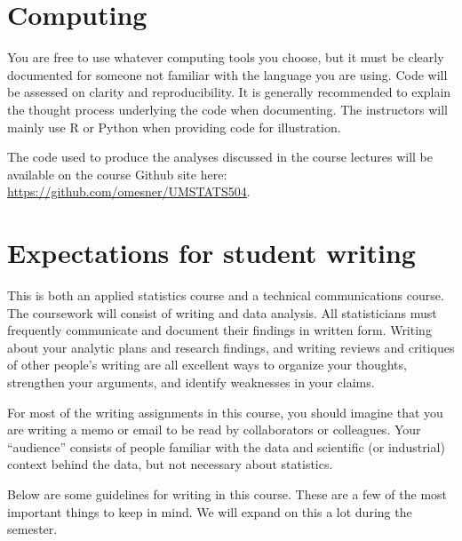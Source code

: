 \documentclass[11pt]{article}
\begin{document}
\section*{Computing}

You are free to use whatever computing tools you choose, but it must be clearly documented for someone not familiar with the language you are using.
Code will be assessed on clarity and reproducibility.
It is generally recommended to explain the thought process underlying the code when documenting.
The instructors will mainly use R or Python when providing code for illustration.

The code used to produce the analyses discussed in the course lectures will be available on the course Github site here: \url{https://github.com/omesner/UMSTATS504}.

\section*{Expectations for student writing}

This is both an applied statistics course and a technical communications course. The coursework will consist of writing and data analysis. All statisticians must frequently communicate and document their findings in written form. Writing about your analytic plans and research findings, and writing reviews and critiques of other people’s writing are all excellent ways to organize your thoughts, strengthen your arguments, and identify weaknesses in your claims.

For most of the writing assignments in this course, you should imagine that you are writing a memo or email to be read by collaborators or colleagues. Your “audience” consists of people familiar with the data and scientific (or industrial) context behind the data, but not necessary about statistics.

Below are some guidelines for writing in this course. These are a few of the most important things to keep in mind. We will expand on this a lot during the semester.
\end{document}
